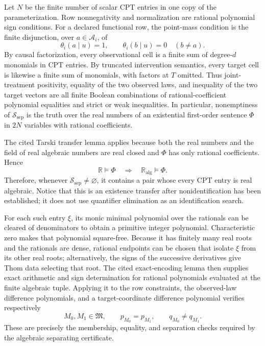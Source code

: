 Let \(N\) be the finite number of scalar CPT entries in one copy of the parameterization.  Row nonnegativity and normalization are rational polynomial sign conditions.  For a declared functional row, the point-mass condition is the finite disjunction, over \(a\in\mathcal A_i\), of
\[
 \theta_i(a\mid u)=1,
 \qquad
 \theta_i(b\mid u)=0\quad(b\ne a).
\]
By causal factorization, every observational cell is a finite sum of degree-\(d\) monomials in CPT entries.  By truncated intervention semantics, every target cell is likewise a finite sum of monomials, with factors at \(T\) omitted.  Thus joint-treatment positivity, equality of the two observed laws, and inequality of the two target vectors are all finite Boolean combinations of rational-coefficient polynomial equalities and strict or weak inequalities.  In particular, nonemptiness of \(\mathcal S_{\mathrm{sep}}\) is the truth over the real numbers of an existential first-order sentence \(\Phi\) in \(2N\) variables with rational coefficients.

The cited Tarski transfer lemma applies because both the real numbers and the field of real algebraic numbers are real closed and \(\Phi\) has only rational coefficients.  Hence
\[
 \mathbb R\models\Phi
 \quad\Longrightarrow\quad
 \mathbb R_{\mathrm{alg}}\models\Phi.
\]
Therefore, whenever \(\mathcal S_{\mathrm{sep}}\ne\varnothing\), it contains a pair whose every CPT entry is real algebraic.  Notice that this is an existence transfer after nonidentification has been established; it does not use quantifier elimination as an identification search.

For each such entry \(\xi\), its monic minimal polynomial over the rationals can be cleared of denominators to obtain a primitive integer polynomial.  Characteristic zero makes that polynomial square-free.  Because it has finitely many real roots and the rationals are dense, rational endpoints can be chosen that isolate \(\xi\) from its other real roots; alternatively, the signs of the successive derivatives give Thom data selecting that root.  The cited exact-encoding lemma then supplies exact arithmetic and sign determination for rational polynomials evaluated at the finite algebraic tuple.  Applying it to the row constraints, the observed-law difference polynomials, and a target-coordinate difference polynomial verifies respectively
\[
 M_0,M_1\in\mathfrak M,
 \qquad p_{M_0}=p_{M_1},
 \qquad q_{M_0}\ne q_{M_1}.
\]
These are precisely the membership, equality, and separation checks required by the algebraic separating certificate.